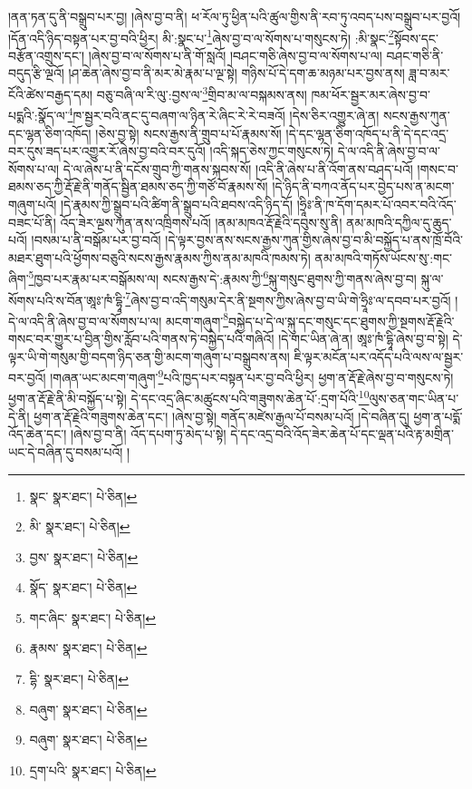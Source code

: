 །ནན་ཏན་དུ་ནི་བསྒྲུབ་པར་བྱ། །ཞེས་བྱ་བ་ནི། ཕ་རོལ་ཏུ་ཕྱིན་པའི་ཚུལ་གྱིས་ནི་རབ་ཏུ་འབད་པས་བསྒྲུབ་པར་བྱའོ། །དོན་འདི་ཉིད་བསྟན་པར་བྱ་བའི་ཕྱིར། མི་:སྣང་པ་\footnote{སྣང་  སྣར་ཐང་།  པེ་ཅིན། }ཞེས་བྱ་བ་ལ་སོགས་པ་གསུངས་ཏེ། :མི་སྣང་\footnote{མི་  སྣར་ཐང་།  པེ་ཅིན། }སྟོབས་དང་བརྩོན་འགྲུས་དང་། །ཞེས་བྱ་བ་ལ་སོགས་པ་ནི་གོ་སླའོ། །བཤང་གཅི་ཞེས་བྱ་བ་ལ་སོགས་པ་ལ། བཤང་གཅི་ནི་བདུད་རྩི་ལྔའོ། །ཤ་ཆེན་ཞེས་བྱ་བ་ནི་མར་མེ་རྣམ་པ་ལྔ་སྟེ། གཉིས་པོ་དེ་དག་ཆ་མཉམ་པར་བྱས་ནས། ཟླ་བ་མར་ངོའི་ཚེས་བརྒྱད་དམ། བཅུ་བཞི་ལ་རི་ལུ་:བྱས་ལ་\footnote{བྱས་  སྣར་ཐང་།  པེ་ཅིན། }གྲིབ་མ་ལ་བསྐམས་ནས། ཁམ་ཕོར་སྦྱར་མར་ཞེས་བྱ་བ་པདྨའི་:སྣོད་ལ་\footnote{སྣོད་  སྣར་ཐང་།  པེ་ཅིན། }ཁ་སྦྱར་བའི་ནང་དུ་བཞག་ལ་ཉིན་རེ་ཞིང་རེ་རེ་བཟའོ། །དེས་ཅིར་འགྱུར་ཞེ་ན། སངས་རྒྱས་ཀུན་དང་ལྷན་ཅིག་འཁོད། །ཅེས་བྱ་སྟེ། སངས་རྒྱས་ནི་གྲུབ་པ་པོ་རྣམས་སོ། །དེ་དང་ལྷན་ཅིག་འཁོད་པ་ནི་དེ་དང་འདྲ་བར་དུས་ཟད་པར་འགྱུར་རོ་ཞེས་བྱ་བའི་བར་དུའོ། །འདི་སྐད་ཅེས་ཀྱང་གསུངས་ཏེ། དེ་ལ་འདི་ནི་ཞེས་བྱ་བ་ལ་སོགས་པ་ལ། དེ་ལ་ཞེས་པ་ནི་དངོས་གྲུབ་ཀྱི་གནས་སྐབས་སོ། །འདི་ནི་ཞེས་པ་ནི་འོག་ནས་བཤད་པའོ། །གསང་བ་ཐམས་ཅད་ཀྱི་རྡོ་རྗེ་ནི་གནོད་སྦྱིན་ཐམས་ཅད་ཀྱི་གཙོ་བོ་རྣམས་སོ། །དེ་ཉིད་ནི་བཀའ་ནོད་པར་བྱེད་པས་ན་མངག་གཞུག་པའོ། །དེ་རྣམས་ཀྱི་སྒྲུབ་པའི་ཚིག་ནི་སྒྲུབ་པའི་ཐབས་འདི་ཉིད་དོ། །ཧྲཱིཿ་ནི་ཁ་དོག་དམར་པོ་འབར་བའི་འོད་བཟང་པོ་ནི། འོད་ཟེར་ལྔས་ཀུན་ནས་འཁྲིགས་པའོ། །ནམ་མཁའ་རྡོ་རྗེའི་དབུས་སུ་ནི། ནམ་མཁའི་དཀྱིལ་དུ་ཆུད་པའོ། །བསམ་པ་ནི་བསྒོམ་པར་བྱ་བའོ། །དེ་ལྟར་བྱས་ནས་སངས་རྒྱས་ཀུན་གྱིས་ཞེས་བྱ་བ་མི་བསྐྱོད་པ་ནས་ཁྲོ་བོའི་མཐར་ཐུག་པའི་ཕྱོགས་བཅུའི་སངས་རྒྱས་རྣམས་ཀྱིས་ནམ་མཁའི་ཁམས་ཏེ། ནམ་མཁའི་གཏོས་ཡོངས་སུ་:གང་ཞིག་\footnote{གང་ཞིང་  སྣར་ཐང་།  པེ་ཅིན། }ཁྱབ་པར་རྣམ་པར་བསྒོམས་ལ། སངས་རྒྱས་དེ་:རྣམས་ཀྱི་\footnote{རྣམས་  སྣར་ཐང་།  པེ་ཅིན། }སྐུ་གསུང་ཐུགས་ཀྱི་གནས་ཞེས་བྱ་བ། སྐུ་ལ་སོགས་པའི་ས་བོན་ཨཱཿ་ཁཾ་དྷཱི་\footnote{དྷི་  སྣར་ཐང་།  པེ་ཅིན། }ཞེས་བྱ་བ་འདི་གསུམ་དེར་ནི་སྔགས་ཀྱིས་ཞེས་བྱ་བ་ཡི་གེ་ཧྲཱིཿ་ལ་དབབ་པར་བྱའོ། །དེ་ལ་འདི་ནི་ཞེས་བྱ་བ་ལ་སོགས་པ་ལ། མངག་གཞུག་\footnote{བཞུག་  སྣར་ཐང་།  པེ་ཅིན། }བསྐྱེད་པ་དེ་ལ་སྐུ་དང་གསུང་དང་ཐུགས་ཀྱི་སྔགས་རྡོ་རྗེའི་གསང་བར་གྱུར་པ་བྱིན་གྱིས་རློབ་པའི་གནས་ཏེ་བསྐྱེད་པའི་གཞིའོ། །དེ་གང་ཡིན་ཞེ་ན། ཨཱཿ་ཁཾ་དྷཱི་ཞེས་བྱ་བ་སྟེ། དེ་ལྟར་ཡི་གེ་གསུམ་གྱི་བདག་ཉིད་ཅན་གྱི་མངག་གཞུག་པ་བསྒྲུབས་ནས། ཇི་ལྟར་མངོན་པར་འདོད་པའི་ལས་ལ་སྦྱར་བར་བྱའོ། །གཞན་ཡང་མངག་གཞུག་\footnote{བཞུག་  སྣར་ཐང་།  པེ་ཅིན། }པའི་ཁྱད་པར་བསྟན་པར་བྱ་བའི་ཕྱིར། ཕྱག་ན་རྡོ་རྗེ་ཞེས་བྱ་བ་གསུངས་ཏེ། ཕྱག་ན་རྡོ་རྗེ་ནི་མི་བསྐྱོད་པ་སྟེ། དེ་དང་འདྲ་ཞིང་མཚུངས་པའི་གཟུགས་ཆེན་པོ་:དྲག་པོའི་\footnote{དྲག་པའི་  སྣར་ཐང་།  པེ་ཅིན། }ལུས་ཅན་གང་ཡིན་པ་དེ་ནི། ཕྱག་ན་རྡོ་རྗེའི་གཟུགས་ཆེན་དང་། །ཞེས་བྱ་སྟེ། གནོད་མཛེས་རྒྱལ་པོ་བསམ་པའོ། །དེ་བཞིན་དུ། ཕྱག་ན་པདྨོ་འོད་ཆེན་དང་། །ཞེས་བྱ་བ་ནི། འོད་དཔག་ཏུ་མེད་པ་སྟེ། དེ་དང་འདྲ་བའི་འོད་ཟེར་ཆེན་པོ་དང་ལྡན་པའི་རྟ་མགྲིན་ཡང་དེ་བཞིན་དུ་བསམ་པའོ། །
